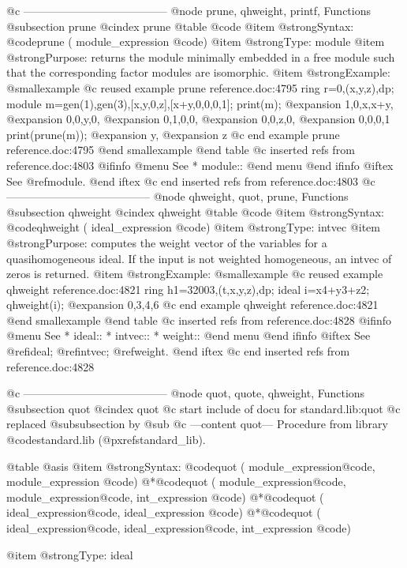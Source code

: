 {{{{{{@c ---------------------------------------
@node prune, qhweight, printf, Functions
@subsection prune
@cindex prune
@table @code
@item @strong{Syntax:}
@code{prune (} module_expression @code{)}
@item @strong{Type:}
module
@item @strong{Purpose:}
returns the module minimally embedded in a free module such that the
corresponding factor modules are isomorphic.
@item @strong{Example:}
@smallexample
@c reused example prune reference.doc:4795 
  ring r=0,(x,y,z),dp;
  module m=gen(1),gen(3),[x,y,0,z],[x+y,0,0,0,1];
  print(m);
@expansion{} 1,0,x,x+y,
@expansion{} 0,0,y,0,  
@expansion{} 0,1,0,0,  
@expansion{} 0,0,z,0,  
@expansion{} 0,0,0,1   
  print(prune(m));
@expansion{} y,
@expansion{} z 
@c end example prune reference.doc:4795
@end smallexample
@end table
@c inserted refs from reference.doc:4803
@ifinfo
@menu
See
* module::
@end menu
@end ifinfo
@iftex
See
@ref{module}.
@end iftex
@c end inserted refs from reference.doc:4803
@c ---------------------------------------
@node qhweight, quot, prune, Functions
@subsection qhweight
@cindex qhweight
@table @code
@item @strong{Syntax:}
@code{qhweight (} ideal_expression @code{)}
@item @strong{Type:}
intvec
@item @strong{Purpose:}
computes the weight vector of the variables for a quasihomogeneous ideal.
If the input is not weighted homogeneous, an intvec of zeros is returned.
@item @strong{Example:}
@smallexample
@c reused example qhweight reference.doc:4821 
  ring h1=32003,(t,x,y,z),dp;
  ideal i=x4+y3+z2;
  qhweight(i);
@expansion{} 0,3,4,6
@c end example qhweight reference.doc:4821
@end smallexample
@end table
@c inserted refs from reference.doc:4828
@ifinfo
@menu
See
* ideal::
* intvec::
* weight::
@end menu
@end ifinfo
@iftex
See
@ref{ideal};
@ref{intvec};
@ref{weight}.
@end iftex
@c end inserted refs from reference.doc:4828

@c ---------------------------------------
@node quot, quote, qhweight, Functions
@subsection quot
@cindex quot
@c start include of docu for standard.lib:quot
@c replaced @subsubsection by @sub
@c ---content quot---
Procedure from library @code{standard.lib} (@pxref{standard_lib}).

@table @asis
@item @strong{Syntax:}
@code{quot (} module_expression@code{,} module_expression @code{)}
@*@code{quot (} module_expression@code{,} module_expression@code{,}
int_expression @code{)}
@*@code{quot (} ideal_expression@code{,} ideal_expression @code{)}
@*@code{quot (} ideal_expression@code{,} ideal_expression@code{,}
int_expression @code{)}

@item @strong{Type:}
ideal

}}}}}}
